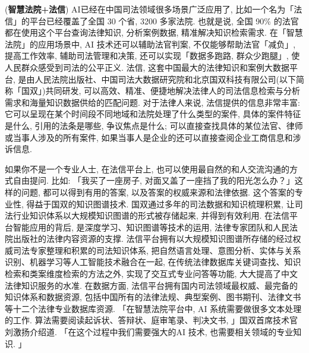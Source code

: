 \begin{example}(\textbf{智慧法院+法信})
AI已经在中国司法领域很多场景广泛应用了, 比如一个名为「法信」的平台已经覆盖了全国 30 个省, 3200 多家法院. 也就是说, 全国 90\% 的法官都在使用这个平台查询法律知识, 分析案例数据, 精准解决知识检索需求.  在「智慧法院」的应用场景中, AI 技术还可以辅助法官判案, 不仅能够帮助法官「减负」, 提高工作效率, 辅助司法管理和决策, 还可以实现「数据多跑路, 群众少跑腿」, 使人民群众感受到司法的公平正义.  法信, 这套中国最大的法律知识和案例大数据平台, 是由人民法院出版社、中国司法大数据研究院和北京国双科技有限公司(以下简称「国双」)共同研发, 可以高效、精准、便捷地解决法律人的司法信息检索与分析需求和海量知识数据供给的匹配问题.
对于法律人来说, 法信提供的信息非常丰富: 它可以呈现在某个时间段不同地域和法院处理了什么类型的案件, 具体的案件特征是什么, 引用的法条是哪些, 争议焦点是什么; 可以直接查找具体的某位法官、律师或当事人涉及的所有案件, 如果当事人是企业的还可以直接查阅企业工商信息和涉诉信息.

如果你不是一个专业人士, 在法信平台上, 也可以使用最自然的和人交流沟通的方式自由提问. 比如: 「我买了一座房子, 对面又盖了一座挡了我的阳光怎么办？」这样的问题, 都可以得到有用的答案, 以及答案的权威来源和法律依据. 这个答案的专业性, 得益于国双的知识图谱技术. 国双通过多年的司法数据和知识梳理积累, 让司法行业知识体系以大规模知识图谱的形式被存储起来, 并得到有效利用. 在法信平台智能应用的背后, 是深度学习、知识图谱等技术的运用, 法律专家团队和人民法院出版社的法律内容资源的支撑. 法信平台拥有以大规模知识图谱所存储的经过权威司法专家整理和积累的司法知识体系, 把自然语言处理、意图分析、实体与关系识别、机器学习等人工智能技术融合在一起, 在传统法律数据库关键词查找、知识检索和类案维度检索的方法之外, 实现了交互式专业问答等功能, 大大提高了中文法律知识服务的水准.  在数据方面, 法信平台拥有国内司法领域最权威、最完备的知识体系和数据资源, 包括中国所有的法律法规、典型案例、图书期刊、法律文书等十二个法律专业数据库资源. 「在智慧法院平台中, AI 系统需要做很多文本处理的工作. 算法需要阅读起诉状、答辩状、庭审笔录、判决文书, 」国双首席技术官刘激扬介绍道. 「在这个过程中我们需要强大的AI 技术, 也需要相关领域的专业知识. 」
\end{example}

